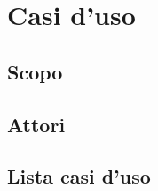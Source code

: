 
\section{Casi d'uso}
\label{sec:casi_uso}

\subsection{Scopo}


\subsection{Attori}


\subsection{Lista casi d'uso}


